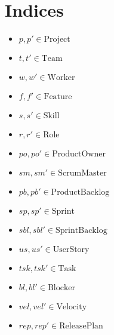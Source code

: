 \documentclass[11pt]{article}
\begin{document}
\section{Indices}
\begin{itemize}
    \item $p, p' \in \text{Project}$
    \item $t, t' \in \text{Team}$
    \item $w, w' \in \text{Worker}$
    \item $f, f' \in \text{Feature}$
    \item $s, s' \in \text{Skill}$
    \item $r, r' \in \text{Role}$
    \item $po, po' \in \text{ProductOwner}$
    \item $sm, sm' \in \text{ScrumMaster}$
    \item $pb, pb' \in \text{ProductBacklog}$
    \item $sp, sp' \in \text{Sprint}$
    \item $sbl, sbl' \in \text{SprintBacklog}$
    \item $us, us' \in \text{UserStory}$
    \item $tsk, tsk' \in \text{Task}$
    \item $bl, bl' \in \text{Blocker}$
    \item $vel, vel' \in \text{Velocity}$
    \item $rep, rep' \in \text{ReleasePlan}$
\end{itemize}
\end{document}
